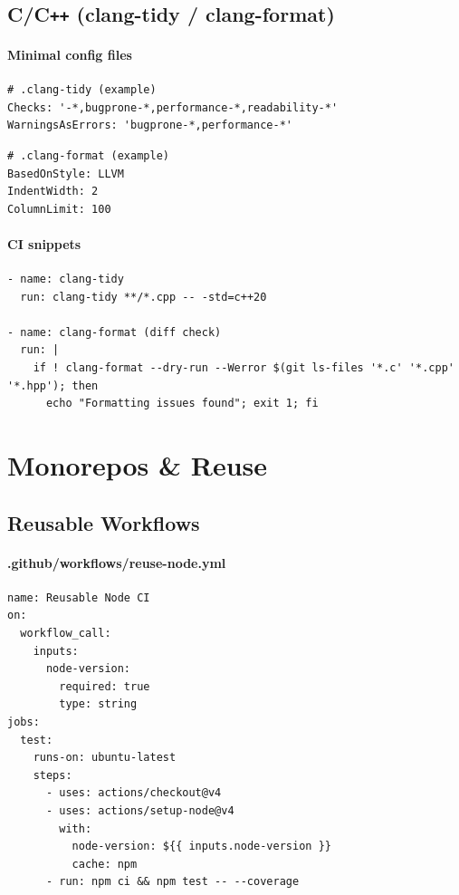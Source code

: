 \documentclass[11pt]{article}
\begin{document}
\subsection{C/C\texttt{++} (clang-tidy / clang-format)}
\paragraph{Minimal config files}
\begin{verbatim}
# .clang-tidy (example)
Checks: '-*,bugprone-*,performance-*,readability-*'
WarningsAsErrors: 'bugprone-*,performance-*'
\end{verbatim}

\begin{verbatim}
# .clang-format (example)
BasedOnStyle: LLVM
IndentWidth: 2
ColumnLimit: 100
\end{verbatim}

\paragraph{CI snippets}
\begin{verbatim}
- name: clang-tidy
  run: clang-tidy **/*.cpp -- -std=c++20

- name: clang-format (diff check)
  run: |
    if ! clang-format --dry-run --Werror $(git ls-files '*.c' '*.cpp' '*.hpp'); then
      echo "Formatting issues found"; exit 1; fi
\end{verbatim}

\section{Monorepos \& Reuse}
\subsection{Reusable Workflows}
\paragraph{.github/workflows/reuse-node.yml}
\begin{verbatim}
name: Reusable Node CI
on:
  workflow_call:
    inputs:
      node-version:
        required: true
        type: string
jobs:
  test:
    runs-on: ubuntu-latest
    steps:
      - uses: actions/checkout@v4
      - uses: actions/setup-node@v4
        with:
          node-version: ${{ inputs.node-version }}
          cache: npm
      - run: npm ci && npm test -- --coverage
\end{verbatim}
\end{document}
